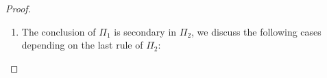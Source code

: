\begin{proof}
\begin{enumerate}
\begin{itemize}
    \item \ElledruleSXXGlName / $\cat{L}$-sequent:
      \begin{center}
        \scriptsize
        $\Pi_1$:
        \begin{math}
          $$\mprset{flushleft}
          \inferrule* [right={\tiny GL}] {
            {
              \begin{array}{c}
                \pi_1 \\
                {<<G1, A, G2 |-l B>>}
              \end{array}
            }
          }{<<G1, Gf A, G2 |-l B>>}
        \end{math}
        \qquad\qquad
        \begin{math}
          \begin{array}{c}
            \Pi_2 \\
            {<<D1, B, D2 |-l C>>}
          \end{array}
        \end{math}
      \end{center}
      By assumption, $c(\Pi_1),c(\Pi_2)\leq |B|$. By induction, there is a proof $\Pi'$ from
      $\pi_2$ and $\Pi_2$ for $<<D1, G1, A, G2, D2 |-l C>>$ s.t. $c(\Pi')\leq |B|$.
      Therefore, the proof $\Pi$ can be constructed as follows with $c(\Pi)\leq |B|$.
      \begin{center}
        \scriptsize
        \begin{math}
          $$\mprset{flushleft}
          \inferrule* [right={\tiny GL}] {
            $$\mprset{flushleft}
            \inferrule* [right={\tiny cut2}] {
              {
                \begin{array}{cc}
                  \pi_2 & \Pi_2 \\
                  {<<G1, A, G2 |-l B>>} & {<<D1, B, D2 |-l C>>}
                \end{array}
              }
            }{<<D1, G1, A, G2, D2 |-l C>>}
          }{<<D1, G1, Gf A, G2, D2 |-l C>>}
        \end{math}
      \end{center}

    \end{itemize}

  \item The conclusion of $\Pi_1$ is secondary in $\Pi_2$, we discuss the following cases
        depending on the last rule of $\Pi_2$:


\end{enumerate}
\end{proof}
